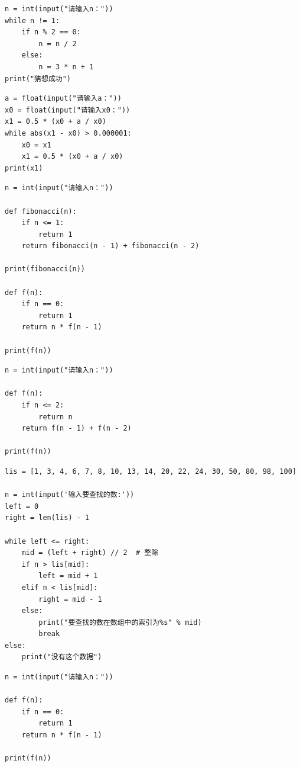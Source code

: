 \begin{lstlisting}[caption = 谷角猜想]
n = int(input("请输入n："))
while n != 1:
    if n % 2 == 0:
        n = n / 2
    else:
        n = 3 * n + 1
print("猜想成功")
\end{lstlisting}

\newpage

\begin{lstlisting}[caption = 求平方根]
a = float(input("请输入a："))
x0 = float(input("请输入x0："))
x1 = 0.5 * (x0 + a / x0)
while abs(x1 - x0) > 0.000001:
    x0 = x1
    x1 = 0.5 * (x0 + a / x0)
print(x1)
\end{lstlisting}


\begin{lstlisting}[caption = 斐波那契数列]
n = int(input("请输入n："))

def fibonacci(n):
    if n <= 1:
        return 1
    return fibonacci(n - 1) + fibonacci(n - 2)

print(fibonacci(n))

def f(n):
    if n == 0:
        return 1
    return n * f(n - 1)

print(f(n))
\end{lstlisting}


\begin{lstlisting}[caption = 跳台阶问题]
n = int(input("请输入n："))

def f(n):
    if n <= 2:
        return n
    return f(n - 1) + f(n - 2)

print(f(n))
\end{lstlisting}


\newpage
\begin{lstlisting}[caption = 二分搜索]
lis = [1, 3, 4, 6, 7, 8, 10, 13, 14, 20, 22, 24, 30, 50, 80, 98, 100]

n = int(input('输入要查找的数:'))
left = 0
right = len(lis) - 1

while left <= right:    
    mid = (left + right) // 2  # 整除
    if n > lis[mid]:
        left = mid + 1
    elif n < lis[mid]:
        right = mid - 1
    else:
        print("要查找的数在数组中的索引为%s" % mid)
        break
else:
    print("没有这个数据")
\end{lstlisting}


\begin{lstlisting}[caption = 阶乘]
n = int(input("请输入n："))

def f(n):
    if n == 0:
        return 1
    return n * f(n - 1)

print(f(n))
\end{lstlisting}